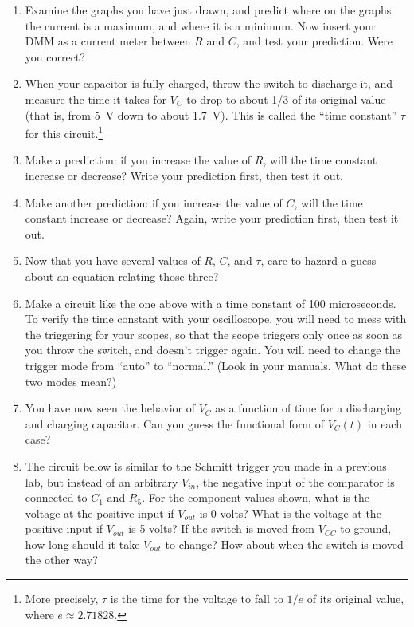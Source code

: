 \begin{enumerate}[wide]
\item Examine the graphs you have just drawn, and predict where on the graphs the current is a maximum, and where it is a minimum.  Now insert your DMM as a current meter between $R$ and $C$, and test your prediction.  Were you correct?

\item When your capacitor is fully charged, throw the switch to discharge it, and measure the time it takes for $V_C$ to drop to about 1/3 of its original value (that is, from 5~V down to about 1.7~V).  This is called the ``time constant'' $\tau$ for this circuit.\footnote{More precisely, $\tau$ is the time for the voltage to fall to $1/e$ of its original value, where $e \approx 2.71828$.}

\item Make a prediction: if you increase the value of $R$, will the time constant increase or decrease?  Write your prediction first, then test it out.

\item Make another prediction: if you increase the value of $C$, will the time constant increase or decrease?  Again, write your prediction first, then test it out.

\item Now that you have several values of $R$, $C$, and $\tau$, care to hazard a guess about an equation relating those three?

\item Make a circuit like the one above with a time constant of 100 microseconds.   To verify the time constant with your oscilloscope, you will need to mess with the triggering for your scopes, so that the scope triggers only once as soon as you throw the switch, and doesn't trigger again.  You will need to change the trigger mode from ``auto'' to ``normal.''  (Look in your manuals.  What do these two modes mean?)

\item You have now seen the behavior of $V_C$ as a function of time for a discharging and charging capacitor.  Can you guess the functional form of $V_C(t)$ in each case?

\item The circuit below is similar to the Schmitt trigger you made in a previous lab, but instead of an arbitrary $V_{in}$, the negative input of the comparator is connected to $C_1$ and $R_5$.  For the component values shown, what is the voltage at the positive input if $V_{out}$ is 0 volts?  What is the voltage at the positive input if $V_{out}$ is 5 volts?  If the switch is moved from $V_{CC}$ to ground, how long should it take $V_{out}$ to change?  How about when the switch is moved the other way?


\end{enumerate}
